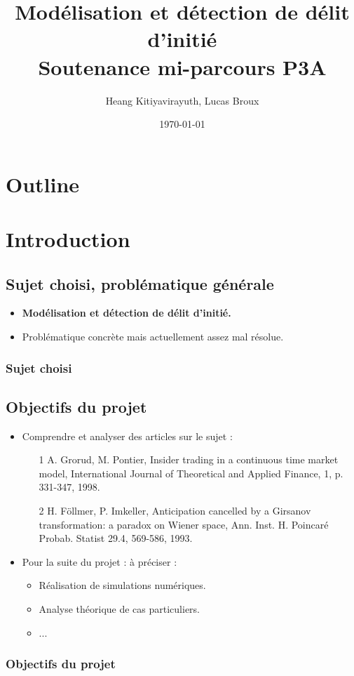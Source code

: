\documentclass[french]{beamer}
\title{Modélisation et détection de délit d'initié \\ Soutenance mi-parcours P3A}
\author{Heang Kitiyavirayuth, Lucas Broux}
\date{\today}
\begin{document}
\begin{frame}
\titlepage
\end{frame}

\section*{Outline}
\begin{frame}
\tableofcontents
\end{frame}


\section{Introduction}
\subsection{Sujet choisi, problématique générale}
\begin{frame}
  \begin{itemize}[<+->]
    \item \textbf{Modélisation et détection de délit d'initié.}
    \item Problématique concrète mais actuellement assez mal résolue.
\end{itemize}
\frametitle{Sujet choisi}
\end{frame}

\subsection{Objectifs du projet}
\begin{frame}
  \begin{itemize}[<+->]
    \item Comprendre et analyser des articles sur le sujet :
    \begin{itemize}
	\item [1] A. Grorud, M. Pontier, Insider trading in a continuous time market model, International Journal of Theoretical and Applied Finance, 1, p. 331-347, 1998.
	\item [2] H. Föllmer, P. Imkeller, Anticipation cancelled by a Girsanov transformation: a paradox on Wiener space, Ann. Inst. H. Poincaré Probab. Statist 29.4, 569-586, 1993.
	\end{itemize}
    \item Pour la suite du projet : à préciser :
    \begin{itemize}
    \item Réalisation de simulations numériques.
    \item Analyse théorique de cas particuliers.
    \item ...
    \end{itemize}
\end{itemize}
\frametitle{Objectifs du projet}
\end{frame}
\end{document}
